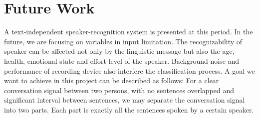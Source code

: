 \section{Future Work}
A text-independent speaker-recognition system is presented at this period.
In the future, we are focusing on variables in input limitation. The
recognizability of speaker can be affected not only by the linguistic message
but also the age, health, emotional state and effort level of the speaker.
Background noise and performance of recording device also interfere the
classification process.
A goal we want to achieve in this project can be described as follows: For a clear conversation signal between two persons, with no sentences overlapped and significant interval between sentences, we may separate the conversation signal into two parts. Each part is exactly all the sentences spoken by a certain speaker.

